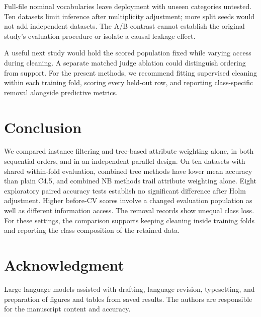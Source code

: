 \documentclass[conference,a4paper]{IEEEtran}
\begin{document}
Full-file nominal vocabularies leave deployment with unseen categories untested. Ten datasets limit inference after multiplicity adjustment; more split seeds would not add independent datasets. The A/B contrast cannot establish the original study's evaluation procedure or isolate a causal leakage effect.

A useful next study would hold the scored population fixed while varying access during cleaning. A separate matched judge ablation could distinguish ordering from support. For the present methods, we recommend fitting supervised cleaning within each training fold, scoring every held-out row, and reporting class-specific removal alongside predictive metrics.

\section{Conclusion}
We compared instance filtering and tree-based attribute weighting alone, in both sequential orders, and in an independent parallel design. On ten datasets with shared within-fold evaluation, combined tree methods have lower mean accuracy than plain C4.5, and combined NB methods trail attribute weighting alone. Eight exploratory paired accuracy tests establish no significant difference after Holm adjustment. Higher before-CV scores involve a changed evaluation population as well as different information access. The removal records show unequal class loss. For these settings, the comparison supports keeping cleaning inside training folds and reporting the class composition of the retained data.

\section*{Acknowledgment}
Large language models assisted with drafting, language revision, typesetting, and preparation of figures and tables from saved results. The authors are responsible for the manuscript content and accuracy.



\end{document}
